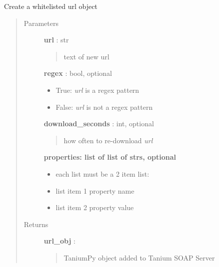 \documentclass[letterpaper,10pt,english]{sphinxmanual}
\begin{document}
\begin{fulllineitems}
\label{pytan.handler:pytan.handler.Handler.create_whitelisted_url}
Create a whitelisted url object
\begin{quote}\begin{description}
\item[{Parameters}] \leavevmode
\textbf{url} : str
\begin{quote}

text of new url
\end{quote}

\textbf{regex} : bool, optional
\begin{itemize}
\item {} 
True: \emph{url} is a regex pattern

\item {} 
False: \emph{url} is not a regex pattern

\end{itemize}

\textbf{download\_seconds} : int, optional
\begin{quote}

how often to re-download \emph{url}
\end{quote}

\textbf{properties: list of list of strs, optional}
\begin{itemize}
\item {} 
each list must be a 2 item list:

\item {} 
list item 1 property name

\item {} 
list item 2 property value

\end{itemize}

\item[{Returns}] \leavevmode
\textbf{url\_obj} : {\hyperref[taniumpy.object_types:taniumpy.object_types.white_listed_url.WhiteListedUrl]{}}
\begin{quote}

TaniumPy object added to Tanium SOAP Server
\end{quote}

\end{description}\end{quote}

\end{fulllineitems}
\end{document}
